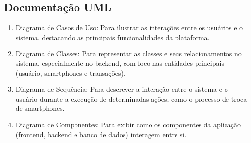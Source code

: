 \subsection{Documentação UML}
    \begin{enumerate}

    \item Diagrama de Casos de Uso: Para ilustrar as interações entre os usuários e o
sistema, destacando as principais funcionalidades da plataforma.
    
    \item Diagrama de Classes: Para representar as classes e seus relacionamentos no
sistema, especialmente no backend, com foco nas entidades principais (usuário,
smartphones e transações).

    \item Diagrama de Sequência: Para descrever a interação entre o sistema e o usuário
durante a execução de determinadas ações, como o processo de troca de
smartphones.
    
    \item Diagrama de Componentes: Para exibir como os componentes da aplicação
(frontend, backend e banco de dados) interagem entre si.
    
    \end{enumerate}


\label{chap:Metodologia}